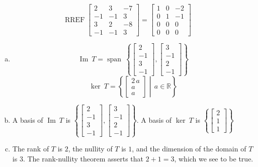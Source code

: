 \begin{exerciseAnswer} 


\[\operatorname{RREF} \left[\begin{array}{ccc}
2 & 3 & -7 \\
-1 & -1 & 3 \\
3 & 2 & -8 \\
-1 & -1 & 3
\end{array}\right] = \left[\begin{array}{ccc}
1 & 0 & -2 \\
0 & 1 & -1 \\
0 & 0 & 0 \\
0 & 0 & 0
\end{array}\right] \]


\begin{enumerate}[(a)]
\item \[\operatorname{Im}\ T = \operatorname{span}\  \left\{ \left[\begin{array}{c}
2 \\
-1 \\
3 \\
-1
\end{array}\right] , \left[\begin{array}{c}
3 \\
-1 \\
2 \\
-1
\end{array}\right] \right\} \]\[\operatorname{ker}\ T =  \left\{ \left[\begin{array}{c}
2 \, a \\
a \\
a
\end{array}\right] \middle|\,a\in\mathbb{R}\right\} \]
\item  A basis of \(\operatorname{Im}\ T\) is \( \left\{ \left[\begin{array}{c}
2 \\
-1 \\
3 \\
-1
\end{array}\right] , \left[\begin{array}{c}
3 \\
-1 \\
2 \\
-1
\end{array}\right] \right\} \). A basis of \(\operatorname{ker}\ T\) is \( \left\{ \left[\begin{array}{c}
2 \\
1 \\
1
\end{array}\right] \right\} \)
\item  The rank of \(T\) is \( 2 \), the nullity of \(T\) is \( 1 \), and the dimension of the domain of \(T\) is \( 3 \). The rank-nullity theorem asserts that \( 2 + 1 = 3 \), which we see to be true. 
\end{enumerate}
    
\end{exerciseAnswer}
    
